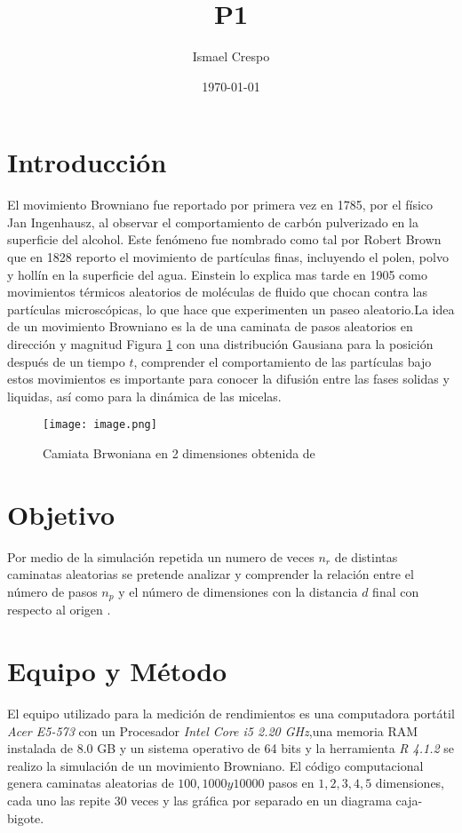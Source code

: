 \documentclass{article}
\title{P1}
\author{Ismael Crespo}
\date{\today}
\begin{document}
\maketitle

\section{Introducción}
El movimiento Browniano fue reportado por primera vez en 1785, por el físico Jan Ingenhausz, al observar el comportamiento de carbón pulverizado en la superficie del alcohol. Este fenómeno fue nombrado como tal por Robert Brown que en 1828 reporto el movimiento de partículas finas, incluyendo el polen, polvo y hollín en la superficie del agua. Einstein lo explica mas tarde en 1905 como movimientos térmicos aleatorios de moléculas de fluido que chocan contra las partículas microscópicas, lo que hace que experimenten un paseo aleatorio.La idea de un movimiento Browniano es la de una caminata de pasos aleatorios en dirección y magnitud Figura \ref{BM} con una distribución Gausiana para la posición después de un tiempo $t$, comprender el comportamiento de las partículas bajo estos movimientos es importante para conocer la difusión entre las fases solidas y liquidas, así como para la dinámica de las micelas\citep{K.Joseph_et_al_1996}.
\begin{figure}[h] %
    \centering
    \texttt{[image: image.png]} %
    \caption{Camiata Brwoniana en 2 dimensiones obtenida de \citep{K.Joseph_et_al_1996}}
    \label{BM}
\end{figure}
\section{Objetivo}
Por medio de la simulación repetida un numero de veces $n_r$ de distintas caminatas aleatorias se pretende analizar y comprender la relación entre el número de pasos $n_p$ y el número de dimensiones con la distancia $d$ final con respecto al origen .
\section{Equipo y Método}
El equipo utilizado para la medición de rendimientos es una computadora portátil \emph{Acer E5-573 } con un Procesador \emph{Intel Core i5 2.20 GHz},una memoria RAM instalada de 8.0 GB y un sistema operativo de 64 bits y la herramienta \emph{R 4.1.2} se realizo la simulación de un movimiento Browniano. El código computacional genera caminatas aleatorias de $100,1000 y 10000$ pasos en $1,2,3,4,5$ dimensiones, cada uno las repite $30$ veces y las gráfica por separado en un diagrama caja-bigote. 
\end{document}
